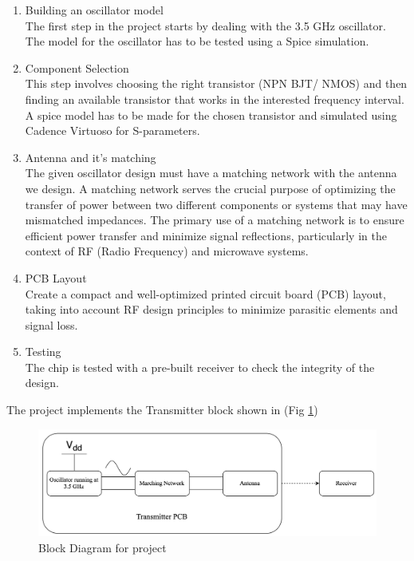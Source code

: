 \documentclass[]{extarticle}
\begin{document}
\begin{enumerate}
    \item Building an oscillator model \\
    The first step in the project starts by dealing with the 3.5 GHz oscillator. The model for the oscillator has to be tested using a Spice simulation.
    \item Component Selection \\
    This step involves choosing the right transistor (NPN BJT/ NMOS) and then finding an available transistor that works in the interested frequency interval. A spice model has to be made for the chosen transistor and simulated using Cadence Virtuoso for S-parameters.
    \item Antenna and it's matching \\
    The given oscillator design must have a matching network with the antenna we design. A matching network serves the crucial purpose of optimizing the transfer of power between two different components or systems that may have mismatched impedances. The primary use of a matching network is to ensure efficient power transfer and minimize signal reflections, particularly in the context of RF (Radio Frequency) and microwave systems.
    \item PCB Layout \\
    Create a compact and well-optimized printed circuit board (PCB) layout, taking into account RF design principles to minimize parasitic elements and signal loss.
    \item Testing \\
    The chip is tested with a pre-built receiver to check the integrity of the design.
    
\end{enumerate}



The project implements the Transmitter block shown in (Fig \ref{fig:block-diagram})

\begin{figure}[!h]
    \centering
    \includegraphics[width=0.8\linewidth]{block_diagram.png}
    \caption{Block Diagram for project}
    \label{fig:block-diagram}
\end{figure}
\end{document}
